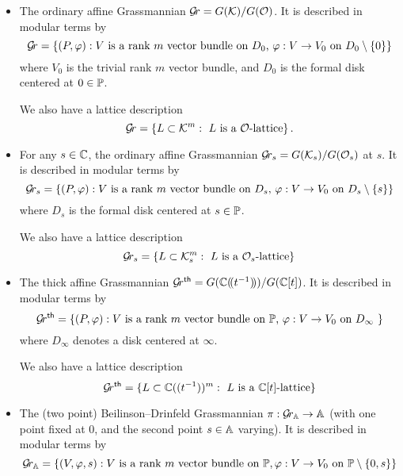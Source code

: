 \documentclass[draft]{article}
\begin{document}
\begin{itemize}
    \item The ordinary affine Grassmannian $\Gr = G(\cK)/G(\cO)$. It is described in modular terms by 
    $$
    \Gr = \{ (P, \varphi) : \text{$V$ is a rank $m$ vector bundle on $ D_0 $, $\varphi : V \rightarrow V_0 $ on $ D_0 \setminus \{0\} $} \} 
    $$
    where $V_0$ is the trivial rank $m$ vector bundle, and $ D_0$ is the formal disk centered at $ 0 \in \PP$.
    
    We also have a lattice description 
    $$ 
    \Gr = \{ L \subset \cK^m : \text{ $L$ is a $\cO$-lattice} \}\,.
    $$
    \item For any $ s \in \CC $,  the ordinary affine Grassmannian $\Gr_s = G(\cK_s)/G(\cO_s)$ at $ s $. It is described in modular terms by
    $$
    \Gr_s = \{ (P, \varphi) : \text{$V$ is a rank $m$ vector bundle on $ D_s $, $\varphi : V \rightarrow V_0 $ on $ D_s \setminus \{s\} $} \} 
    $$
    where $D_s$ is the formal disk centered at $s\in\PP$.

    We also have a lattice description 
$$ \Gr_s = \{ L \subset \cK_s^m : \text{ $L$ is a $\cO_s$-lattice} \} $$   
    \item The thick affine Grassmannian $\Gr^{\sf th} = G(\CC\xT[t^{-1}])/G(\CC[t])$. It is described in modular terms by
    $$
        \Grth = \{ (P, \varphi) : \text{$V$ is a rank $m$ vector bundle on $ \PP $, $\varphi : V \rightarrow V_0 $ on $ D_\infty $ } \} %
    $$
    where $D_\infty$ denotes a disk centered at $ \infty$. 
    
    We also have a lattice description 
    $$ 
    \Gr^{\sf th} = \{ L \subset  \CC((t^{-1}))^m : \text{ $L$ is a $\CC[t]$-lattice} \}
    $$   
    
     

    \item The (two point) Beilinson--Drinfeld Grassmannian $\pi : \Grbd\to \AA$ (with one point fixed at 0, and the second point $s\in\AA$ varying).
    It is described in modular terms by
    $$
    \Grbd = 
        \left\{ 
            (V,\varphi,s) : V\text{ is a rank $m$ vector bundle on }\PP, \varphi : V \rightarrow V_0 \text{ on } \PP \setminus \{0, s\}  
        \right\} 
    $$%


\end{itemize}
\end{document}
